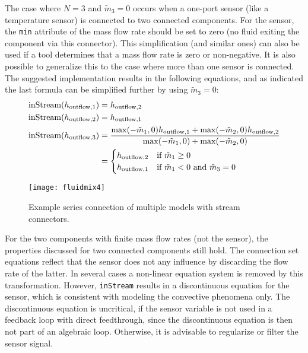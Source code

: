 The case where $N=3$ and $\tilde{m}_3=0$ occurs when a one-port sensor (like a temperature sensor) is connected to two connected components.
For the sensor, the \lstinline!min! attribute of the mass flow rate should be set to zero (no fluid exiting the component via this connector).
This simplification (and similar ones) can also be used if a tool determines that a mass flow rate is zero or non-negative.
It is also possible to generalize this to the case where more than one sensor is connected.
The suggested implementation results in the following equations, and as indicated the last formula can be simplified further by using $\tilde{m}_3=0$:
\begin{align*}
\text{\lstinline!inStream!}(h_{\mathrm{outflow},1}) &= h_{\mathrm{outflow},2}\\
\text{\lstinline!inStream!}(h_{\mathrm{outflow},2}) &= h_{\mathrm{outflow},1}\\
\text{\lstinline!inStream!}(h_{\mathrm{outflow},3}) &= \frac{\operatorname{max}(-\tilde{m}_1,0)h_{\mathrm{outflow},1}+\operatorname{max}(-\tilde{m}_2,0)h_{\mathrm{outflow},2}}{\operatorname{max}(-\tilde{m}_1,0)+\operatorname{max}(-\tilde{m}_2,0)}\\
&=
\begin{cases}
h_{\mathrm{outflow},2}&\text{if $\tilde{m}_1 \geq 0$}\\
h_{\mathrm{outflow},1}&\text{if $\tilde{m}_1 < 0$ and $\tilde{m}_3 = 0$}
\end{cases}
\end{align*}
\begin{figure}[H]
  \begin{center}
    \texttt{[image: fluidmix4]}
  \end{center}
  \caption{Example series connection of multiple models with stream connectors.}
\end{figure}

For the two components with finite mass flow rates (not the sensor), the properties discussed for two connected components still hold.
The connection set equations reflect that the sensor does not any influence by discarding the flow rate of the latter.
In several cases a non-linear equation system is removed by this transformation.
However, \lstinline!inStream! results in a discontinuous equation for the sensor, which is consistent with modeling the convective phenomena only.
The discontinuous equation is uncritical, if the sensor variable is not used in a feedback loop with direct feedthrough, since the discontinuous equation is then not part of an algebraic loop.
Otherwise, it is advisable to regularize or filter the sensor signal.

